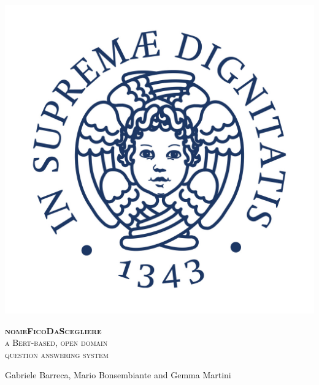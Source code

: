 \documentclass[10pt,hidelinks]{article}
\newcommand{\nomefico}{\textbf{nomeFicoDaScegliere}}
\begin{document}
\begin{titlepage}
    \centering
    \scalebox{0.7} {
        \begin{minipage}{0.22\textwidth}%
            \includegraphics[width=\linewidth]{pics/Cherubino.jpg}
        \end{minipage}\hspace{10pt}
        \begin{minipage}{0.9\textwidth}%
            \flushright
            \large
            \vspace{0.8cm}
            \textsc{\color{pblue}%
            \nomefico\\
            a Bert-based, open domain\\
            question answering system}
        \end{minipage}%
    }

    \vspace{0.3cm}
    
    Gabriele Barreca, Mario Bonsembiante {\small and} Gemma Martini
    
    

\end{titlepage}
\end{document}
